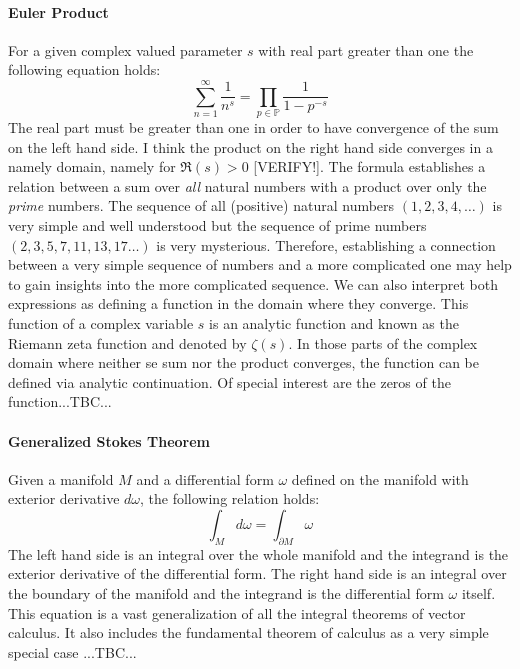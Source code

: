 \paragraph{Euler Product}
For a given complex valued parameter $s$ with real part greater than one the following equation holds:
\begin{equation}
\sum_{n=1}^{\infty} \frac{1}{n^s} = 
\prod_{p \in \mathbb{P}} \frac{1}{1 - p^{-s}}
\end{equation}
The real part must be greater than one in order to have convergence of the sum on the left hand side. I think the product on the right hand side converges in a namely domain, namely for $\Re(s) > 0$ [VERIFY!]. The formula establishes a relation between a sum over \emph{all} natural numbers with a product over only the \emph{prime} numbers. The sequence of all (positive) natural numbers $(1,2,3,4,\ldots)$ is very simple and well understood but the sequence of prime numbers $(2,3,5,7,11,13,17\ldots)$ is very mysterious. Therefore, establishing a connection between a very simple sequence of numbers and a more complicated one may help to gain insights into the more complicated sequence. We can also interpret both expressions as defining a function in the domain where they converge. This function of a complex variable $s$ is an analytic function and known as the Riemann zeta function and denoted by $\zeta(s)$. In those parts of the complex domain where neither se sum nor the product converges, the function can be defined via analytic continuation. Of special interest are the zeros of the function...TBC...


\paragraph{Generalized Stokes Theorem}
Given a manifold $M$ and a differential form $\omega$ defined on the manifold with exterior derivative $d \omega$, the following relation holds:
\begin{equation}
\int_{M} d \omega = \int_{\partial M} \omega
\end{equation}
The left hand side is an integral over the whole manifold and the integrand is the exterior derivative of the differential form. The right hand side is an integral over the boundary of the manifold and the integrand is the differential form $\omega$ itself. This equation is a vast generalization of all the integral theorems of vector calculus. It also includes the fundamental theorem of calculus as a very simple special case ...TBC...


